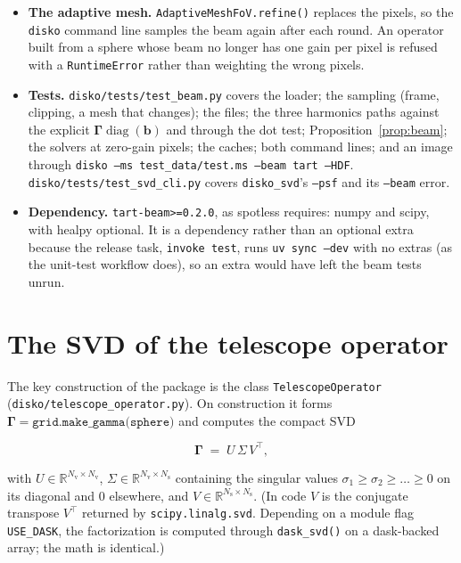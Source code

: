 \documentclass[11pt,a4paper]{article}
\newcommand{\R}{\mathbb{R}}
\newcommand{\Ns}{N_{\mathrm{s}}}
\newcommand{\Nv}{N_{\mathrm{v}}}
\newcommand{\Gammam}{\boldsymbol{\Gamma}}
\newcommand{\bvec}{\boldsymbol{b}}
\begin{document}
\begin{itemize}
  \texttt{HealpixFoV.to\_svg()} already skips those on or below the horizon.
\item \textbf{The adaptive mesh.} \texttt{AdaptiveMeshFoV.refine()}
  replaces the pixels, so the \texttt{disko} command line samples the beam
  again after each round. An operator built from a sphere whose beam no
  longer has one gain per pixel is refused with a \texttt{RuntimeError}
  rather than weighting the wrong pixels.
\item \textbf{Tests.} \texttt{disko/tests/test\_beam.py} covers the loader;
  the sampling (frame, clipping, a mesh that changes); the files; the three
  harmonics paths against the explicit $\Gammam\operatorname{diag}(\bvec)$
  and through the dot test; Proposition~\ref{prop:beam}; the solvers at
  zero-gain pixels; the caches; both command lines; and an image through
  \texttt{disko --ms test\_data/test.ms --beam tart --HDF}.
  \texttt{disko/tests/test\_svd\_cli.py} covers \texttt{disko\_svd}'s
  \texttt{--psf} and its \texttt{--beam} error.
\item \textbf{Dependency.} \texttt{tart-beam>=0.2.0}, as spotless requires:
  numpy and scipy, with healpy optional. It is a dependency rather than an
  optional extra because the release task, \texttt{invoke test}, runs
  \texttt{uv sync --dev} with no extras (as the unit-test workflow does), so
  an extra would have left the beam tests unrun.
\end{itemize}

\section{The SVD of the telescope operator}
\label{sec:svd}

The key construction of the package is the class \texttt{TelescopeOperator}
(\texttt{disko/telescope\_operator.py}). On construction it forms
$\Gammam=\texttt{grid.make\_gamma(sphere)}$ and computes the compact SVD

\begin{equation}
  \label{eq:svd}
  \Gammam \;=\; U\,\Sigma\,V^{\!\top},
\end{equation}

with $U\in\R^{\Nv\times\Nv}$, $\Sigma\in\R^{\Nv\times\Ns}$ containing the
singular values $\sigma_1\ge\sigma_2\ge\dots\ge0$ on its diagonal and $0$
elsewhere, and $V\in\R^{\Ns\times\Ns}$. (In code $V$ is the conjugate
transpose $V^{\!\top}$ returned by \texttt{scipy.linalg.svd}. Depending on a
module flag \texttt{USE\_DASK}, the factorization is computed through
\texttt{dask\_svd()} on a dask-backed array; the math is identical.)
\end{document}
